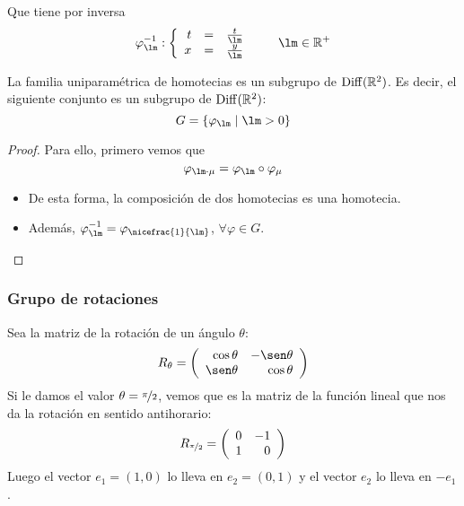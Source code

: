 Que tiene por inversa
\begin{equation*}
    \varphi_\lm^{-1}: \left\{\begin{array}{rcl}
            t &= &\frac{t}{\lm}\\
            x &= &\frac{y}{\lm}
    \end{array}\right. \qquad \lm \in \mathbb{R}^+
\end{equation*}

\begin{prop}
    La familia uniparamétrica de homotecias es un subgrupo de $\operatorname{Diff}(\mathbb{R}^2)$. Es decir, el siguiente conjunto es un subgrupo de $\operatorname{Diff}(\mathbb{R}^2)$:
    \begin{equation*}
        G = \{\varphi_\lm \mid \lm > 0\}
    \end{equation*}

    \begin{proof}
        Para ello, primero vemos que
        \begin{equation*}
            \varphi_{\lm \cdot \mu} = \varphi_\lm \circ \varphi_\mu
        \end{equation*}

        \begin{itemize}
            \item De esta forma, la composición de dos homotecias es una homotecia.
            \item Además, $\varphi_\lm^{-1} = \varphi_{\nicefrac{1}{\lm}}$, $\forall \varphi \in G$.
        \end{itemize}
    \end{proof}
\end{prop}

\subsubsection{Grupo de rotaciones}
Sea la matriz de la rotación de un ángulo $\theta$:
\begin{equation*}
    R_\theta = \left(\begin{array}{rr}
            \cos\theta & -\sen\theta \\
            \sen\theta & \cos\theta
    \end{array}\right)
\end{equation*}
Si le damos el valor $\theta = \nicefrac{\pi}{2}$, vemos que es la matriz de la función lineal que nos da la rotación en sentido antihorario:
\begin{equation*}
    R_{\nicefrac{\pi}{2}} = \left(\begin{array}{rr}
            0 & -1 \\
            1 & 0
    \end{array}\right)
\end{equation*}
Luego el vector $e_1=(1,0)$ lo lleva en $e_2=(0,1)$ y el vector $e_2$ lo lleva en $-e_1$.

